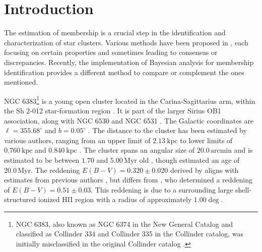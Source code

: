 \documentclass{aa}
\begin{document}


   \maketitle

\section{Introduction}\label{S_intro}
The estimation of membership is a crucial step in the identification and characterization of star clusters. Various methods have been proposed in \cite{1930LicOB..14..154T, 1949ApJ...110..117S, 2018AA...610A..30A, 1978MNRAS.182..607F, 1989MNRAS.236..263P, 1991MNRAS.249...76B, 2005AA...438.1163K, 2007AA...462..157P, 1968ArA.....5....1L}, each focusing on certain properties and sometimes leading to consensus or discrepancies. Recently, the implementation of Bayesian analysis for membership identification provides a different method to compare or complement the ones mentioned.

NGC 6383\footnote{NGC 6383, also known as NGC 6374 in the New General Catalog \citep{2008hsf2.book..497R} and classified as Collinder 334 and Collinder 335 in the Collinder catalog, was initially misclassified in the original Collinder catalog \citep{1931AnLun...2....1C}.} is a young open cluster located in the Carina-Sagittarius arm, within the Sh 2-012 star-formation region \citep{1959ApJS....4..257S}. It is part of the larger Sirius OB1 association, along with NGC 6530 and NGC 6531 \citep{2008hsf2.book..497R}. The Galactic coordinates are $\ell = 355.68^{\circ}$ and $b = 0.05^{\circ}$ \citep{2017A&A...600A.106C}. The distance to the cluster has been estimated by various authors, ranging from an upper limit of $2.13~\mathrm{kpc}$ \citep{1930LicOB..14..154T} to lower limits of $0.760~\mathrm{kpc}$ \citep{1949ApJ...110..117S} and $0.840~\mathrm{kpc}$ \citep{2018AA...610A..30A}. The cluster spans an angular size of $20.0\,\mathrm{arcmin}$ \citep{2013A&A...560A..76M} and is estimated to be between $1.70$ and $5.00\,\mathrm{Myr}$ old \citep{1978MNRAS.182..607F,1989MNRAS.236..263P,1991MNRAS.249...76B,2005AA...438.1163K,2007AA...462..157P}, though \citet{1968ArA.....5....1L} estimated an age of $20.0\,\mathrm{Myr}$. The reddening $E(B-V) = 0.320 \pm 0.020$ derived by \citet{2008hsf2.book..497R} aligns with estimates from previous authors \citep{1971AAS....4..241B,1978MNRAS.182..607F,1978MNRAS.184..661L,1985AA...151..391T,1989MNRAS.236..263P,1994RMxAA..29..141F,2007AA...462..157P}, but differs from \citet{2018AA...610A..30A}, who determined a reddening of $E(B-V) = 0.51 \pm 0.03$. This reddening is due to a surrounding large shell-structured ionized HII region with a radius of approximately $1.00\deg$.
\end{document}
